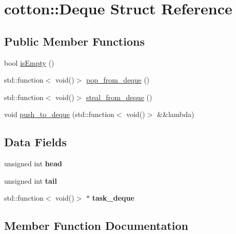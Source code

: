 \hypertarget{structcotton_1_1Deque}{}\section{cotton\+:\+:Deque Struct Reference}
\label{structcotton_1_1Deque}
\subsection*{Public Member Functions}
\begin{DoxyCompactItemize}
\item 
bool \mbox{\hyperlink{structcotton_1_1Deque_aa9786768e53c18c03e6e641e06e075e6}{is\+Empty}} ()
\item 
std\+::function$<$ void()$>$ \mbox{\hyperlink{structcotton_1_1Deque_a3ed7ee8c99eb531a0a0f769453c7e0d8}{pop\+\_\+from\+\_\+deque}} ()
\item 
std\+::function$<$ void()$>$ \mbox{\hyperlink{structcotton_1_1Deque_ac890b51124250fc9d179527d2d8f7799}{steal\+\_\+from\+\_\+deque}} ()
\item 
void \mbox{\hyperlink{structcotton_1_1Deque_a25b82cdb2dedb264c91301a050990203}{push\+\_\+to\+\_\+deque}} (std\+::function$<$ void()$>$ \&\&lambda)
\end{DoxyCompactItemize}
\subsection*{Data Fields}
\begin{DoxyCompactItemize}
\item 
\mbox{\label{structcotton_1_1Deque_a308f8b4aeccac0361b8aac86af5c08a9}} 
unsigned int {\bfseries head}
\item 
\mbox{\label{structcotton_1_1Deque_aeaec5392dc7ffe5dc6eaa1bbb97b5f89}} 
unsigned int {\bfseries tail}
\item 
\mbox{\label{structcotton_1_1Deque_a8bce36d5e899a183026a5026d2d1158e}} 
std\+::function$<$ void()$>$ $\ast$ {\bfseries task\+\_\+deque}
\end{DoxyCompactItemize}


\subsection{Member Function Documentation}
\mbox{\label{structcotton_1_1Deque_aa9786768e53c18c03e6e641e06e075e6}} 
